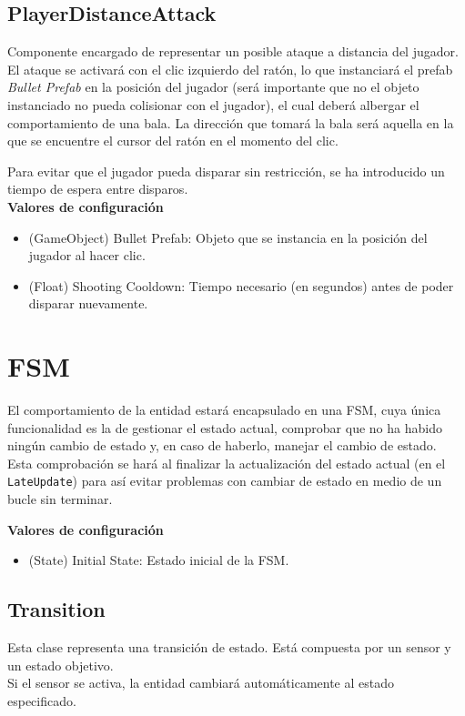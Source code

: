 \subsection{PlayerDistanceAttack}

Componente encargado de representar un posible ataque a distancia del jugador. El ataque se activará con el clic izquierdo del ratón, lo que instanciará el prefab \textit{Bullet Prefab} en la posición del jugador (será importante que no el objeto instanciado no pueda colisionar con el jugador), el cual deberá albergar el comportamiento de una bala. La dirección que tomará la bala será aquella en la que se encuentre el cursor del ratón en el momento del clic.

Para evitar que el jugador pueda disparar sin restricción, se ha introducido un tiempo de espera entre disparos.\\

\textbf{Valores de configuración}
\begin{itemize}
	\item (GameObject) Bullet Prefab: Objeto que se instancia en la posición del jugador al hacer clic.
	\item (Float) Shooting Cooldown: Tiempo necesario (en segundos) antes de poder disparar nuevamente.
\end{itemize}

\section {FSM}

El comportamiento de la entidad estará encapsulado en una FSM, cuya única funcionalidad es la de gestionar el estado actual, comprobar que no ha habido ningún cambio de estado y, en caso de haberlo, manejar el cambio de estado.\\
Esta comprobación se hará al finalizar la actualización del estado actual (en el \texttt{LateUpdate}) para así evitar problemas con cambiar de estado en medio de un bucle sin terminar.

\textbf{Valores de configuración}
\begin{itemize}
	\item (State) Initial State: Estado inicial de la FSM.
\end{itemize}

\subsection{Transition}
Esta clase representa una transición de estado. Está compuesta por un sensor y un estado objetivo.\\
Si el sensor se activa, la entidad cambiará automáticamente al estado especificado.\\

